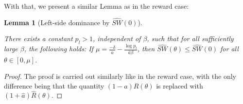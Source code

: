 \documentclass{article}
\newtheorem{lemma}{Lemma}
\newtheorem{claim}{Claim}
\begin{document}
With that, we present a similar Lemma as in the reward case:
\begin{lemma}[Left-side dominance by $\widehat{SW}(0)$]
\label{lem:lower_bound_p}

There exists a constant $p_l > 1$, independent of $\beta$, such that for all sufficiently large $\beta$, the following holds: If $\mu = \frac{-\delta}{\hat{a}} - \frac{\log p_l}{\hat{a}\beta}$, then $\widehat{SW}(\theta) \le \widehat{SW}(0)$ for all $\theta \in [0, \mu]$.
\end{lemma}
\begin{proof}
The proof is carried out similarly like in the reward case, with the only difference being that the quantity $(1-a)R(\theta)$ is replaced with $(1+\hat{a})\hat{R}(\theta)$.






\end{proof}
\end{document}

